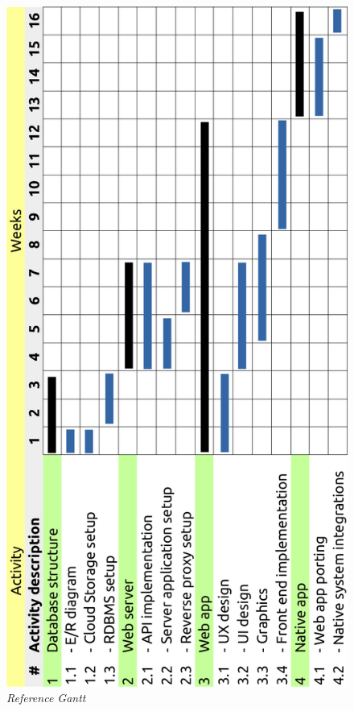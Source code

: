 \begin{figure}[H]
  \centering
  \includegraphics[origin=c,width=\textwidth,height=.95\textheight,keepaspectratio]{DD_Images/Gantt.jpg}
  \caption{\textit{Reference Gantt}}
\end{figure}